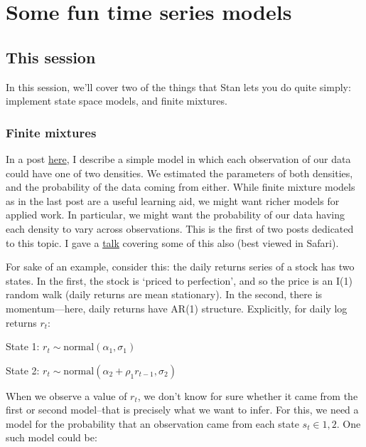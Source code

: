 \documentclass[]{book}
\begin{document}
\chapter{Some fun time series models}\label{funtimeseries}

\section{This session}\label{this-session}

In this session, we'll cover two of the things that Stan lets you do
quite simply: implement state space models, and finite mixtures.

\subsection{Finite mixtures}\label{finite-mixtures}

In a post
\href{https://modernstatisticalworkflow.blogspot.com/2016/10/finite-mixture-models-in-stan.html}{here},
I describe a simple model in which each observation of our data could
have one of two densities. We estimated the parameters of both
densities, and the probability of the data coming from either. While
finite mixture models as in the last post are a useful learning aid, we
might want richer models for applied work. In particular, we might want
the probability of our data having each density to vary across
observations. This is the first of two posts dedicated to this topic. I
gave a
\href{https://dl.dropboxusercontent.com/u/63100926/become_a_bayesian_shareable.html}{talk}
covering some of this also (best viewed in Safari).

For sake of an example, consider this: the daily returns series of a
stock has two states. In the first, the stock is `priced to perfection',
and so the price is an I(1) random walk (daily returns are mean
stationary). In the second, there is momentum---here, daily returns have
AR(1) structure. Explicitly, for daily log returns \(r_{t}\):

State 1: \(r_{t} \sim \mbox{normal}(\alpha_{1}, \sigma_{1})\)

State 2:
\(r_{t} \sim \mbox{normal}(\alpha_{2} + \rho_{1} r_{t-1}, \sigma_{2})\)

When we observe a value of \(r_{t}\), we don't know for sure whether it
came from the first or second model--that is precisely what we want to
infer. For this, we need a model for the probability that an observation
came from each state \(s_{t}\in 1, 2\). One such model could be:
\end{document}

